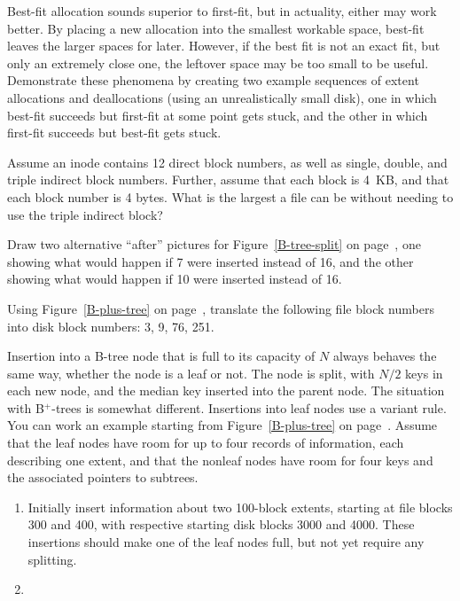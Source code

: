 \begin{chapterEnumerate}
\item\label{best-fit-first-fit-exercise}
Best-fit allocation sounds superior to first-fit, but in actuality,
either may work better.  By placing a new allocation into the smallest
workable space, best-fit leaves the larger spaces for later.  However,
if the best fit is not an exact fit, but only an extremely close one,
the leftover space may be too small to be useful.  Demonstrate these
phenomena by creating two example sequences of extent allocations and
deallocations (using an unrealistically small disk), one in which
best-fit succeeds but first-fit at some point gets stuck, and the
other in which first-fit succeeds but best-fit gets stuck.
\item\label{largest-double-indirect-exercise}
Assume an inode contains 12 direct block numbers, as well as single,
double, and triple indirect block numbers.  Further, assume that each
block is 4~KB, and that each block number is 4 bytes.  What is the
largest a file can be without needing to use the triple indirect block?
\item
Draw two alternative ``after'' pictures for Figure~\ref{B-tree-split}
on page~\pageref{B-tree-split},
one showing what would happen if 7 were inserted instead of 16, and
the other showing what would happen if 10 were inserted instead of 16.
\item
Using Figure~\ref{B-plus-tree} on page~\pageref{B-plus-tree}, translate the following file block
numbers into disk block numbers: 3, 9, 76, 251.
\item\label{Bplus-tree-insertion-exercise}
Insertion into a B-tree node that is full to its capacity of $N$
always behaves the same way, whether the node is a leaf or not.  The
node is split, with $N/2$ keys in each new node, and the median key
inserted into the parent node.  The situation with B${}^+$-trees is
somewhat different.  Insertions into leaf nodes use a variant rule.
You can work an example starting from
Figure~\ref{B-plus-tree} on page~\pageref{B-plus-tree}.  Assume that
the leaf nodes have room for up to four records of information, each
describing one extent, and that the nonleaf nodes have room for four
keys and the associated pointers to subtrees.
\begin{enumerate}
\item
Initially insert information about two 100-block extents, starting at
file blocks 300 and 400, with respective starting disk blocks 3000 and
4000.  These insertions should make one of the leaf nodes full, but
not yet require any splitting.
\item

\end{enumerate}
\end{chapterEnumerate}
